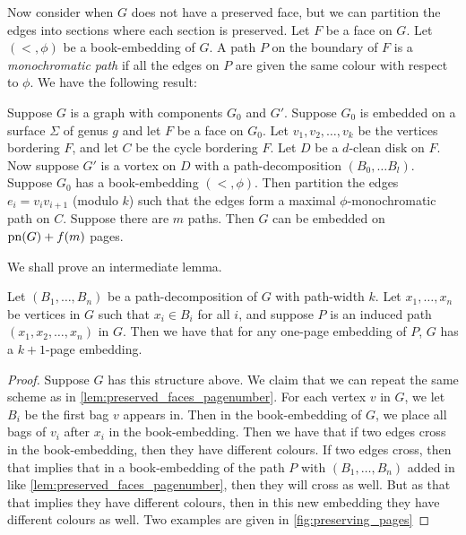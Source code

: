 Now consider when \(G\) does not have a preserved face, but we can partition the edges into sections where each section is preserved. Let \(F\) be a face on \(G\). Let \( (<, \phi) \) be a book-embedding of \(G\). A path \(P\) on the boundary of \(F\) is a \textit{monochromatic path} if all the edges on \(P\) are given the same colour with respect to \( \phi \). We have the following result:
\begin{lemma}\label{lem:vortices_mono_paths}
	Suppose \(G\) is a graph with components \(G_0\) and \(G'\). Suppose \(G_0\) is embedded on a surface \(\Sigma \) of genus \(g\) and let \(F\) be a face on \(G_0\). Let \(v_1, v_2, \ldots, v_k\) be the vertices bordering \(F\), and let \(C\) be the cycle bordering \(F\). Let \(D\) be a \(d\)-clean disk on \(F\). Now suppose \(G'\) is a vortex on \(D\) with a path-decomposition \((B_0, \ldots B_l)\). Suppose \(G_0\) has a book-embedding \((<, \phi)\). Then partition the edges \(e_i = v_i v_{i + 1}\) (modulo \(k\)) such that the edges form a maximal \(\phi \)-monochromatic path on \(C\). Suppose there are \(m\) paths. Then \(G\) can be embedded on \(\operatorname{pn}(G) + f(m)\) pages.
\end{lemma}
We shall prove an intermediate lemma. 
\begin{lemma}\label{lem:one_page_decomposition}
	Let \((B_1, \ldots, B_n)\) be a path-decomposition of \(G\) with path-width \(k\). Let \(x_1, \ldots, x_n\) be vertices in \(G\) such that \(x_i \in B_i\) for all \(i\), and suppose \(P\) is an induced path \((x_1, x_2, \ldots, x_n)\) in \(G\). Then we have that for any one-page embedding of \(P\), \(G\) has a \(k + 1\)-page embedding. 
\end{lemma}
\begin{proof}
	Suppose \(G\) has this structure above.
	We claim that we can repeat the same scheme as in \cref{lem:preserved_faces_pagenumber}. For each vertex \(v\) in \(G\), we let \(B_i\) be the first bag \(v\) appears in. Then in the book-embedding of \(G\), we place all bags of \(v_i\) after \(x_i\) in the book-embedding. Then we have that if two edges cross in the book-embedding, then they have different colours. If two edges cross, then that implies that in a book-embedding of the path \(P\) with \((B_1, \ldots, B_n)\) added in like \cref{lem:preserved_faces_pagenumber}, then they will cross as well. But as that that implies they have different colours, then in this new embedding they have different colours as well. Two examples are given in \cref{fig:preserving_pages}
\end{proof}


